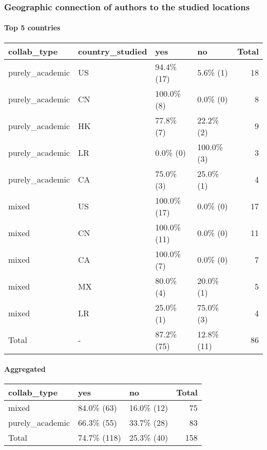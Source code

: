 \documentclass[
]{article}
\begin{document}
\hypertarget{geographic-connection-of-authors-to-the-studied-locations}{%
\subsubsection{Geographic connection of authors to the studied
locations}\label{geographic-connection-of-authors-to-the-studied-locations}}

\hypertarget{top-5-countries}{%
\paragraph{Top 5 countries}\label{top-5-countries}}

\begin{longtable}[]{@{}llllr@{}}
\toprule
collab\_type & country\_studied & yes & no & Total \\
\midrule
\endhead
purely\_academic & US & 94.4\% (17) & 5.6\% (1) & 18 \\
purely\_academic & CN & 100.0\% (8) & 0.0\% (0) & 8 \\
purely\_academic & HK & 77.8\% (7) & 22.2\% (2) & 9 \\
purely\_academic & LR & 0.0\% (0) & 100.0\% (3) & 3 \\
purely\_academic & CA & 75.0\% (3) & 25.0\% (1) & 4 \\
mixed & US & 100.0\% (17) & 0.0\% (0) & 17 \\
mixed & CN & 100.0\% (11) & 0.0\% (0) & 11 \\
mixed & CA & 100.0\% (7) & 0.0\% (0) & 7 \\
mixed & MX & 80.0\% (4) & 20.0\% (1) & 5 \\
mixed & LR & 25.0\% (1) & 75.0\% (3) & 4 \\
Total & - & 87.2\% (75) & 12.8\% (11) & 86 \\
\bottomrule
\end{longtable}

\hypertarget{aggregated}{%
\paragraph{Aggregated}\label{aggregated}}

\begin{longtable}[]{@{}lllr@{}}
\toprule
collab\_type & yes & no & Total \\
\midrule
\endhead
mixed & 84.0\% (63) & 16.0\% (12) & 75 \\
purely\_academic & 66.3\% (55) & 33.7\% (28) & 83 \\
Total & 74.7\% (118) & 25.3\% (40) & 158 \\
\bottomrule
\end{longtable}
\end{document}
